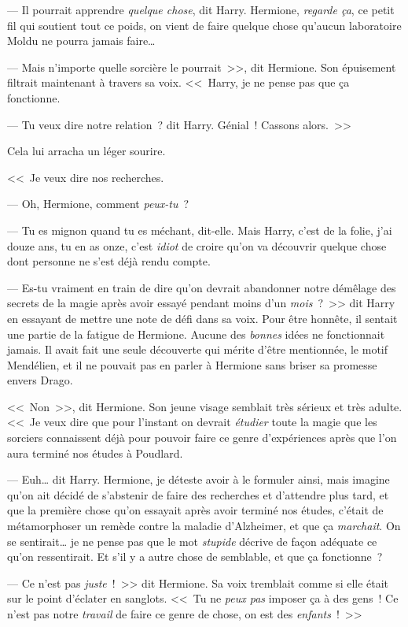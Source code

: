 --- Il pourrait apprendre \emph{quelque chose}, dit Harry. Hermione, \emph{regarde ça}, ce petit fil qui soutient tout ce poids, on vient de faire quelque chose qu'aucun laboratoire Moldu ne pourra jamais faire…

--- Mais n'importe quelle sorcière le pourrait~>>, dit Hermione. Son épuisement filtrait maintenant à travers sa voix. <<~Harry, je ne pense pas que ça fonctionne.

--- Tu veux dire notre relation~? dit Harry. Génial~! Cassons alors.~>>

Cela lui arracha un léger sourire.

<<~Je veux dire nos recherches.

--- Oh, Hermione, comment \emph{peux-tu}~?

--- Tu es mignon quand tu es méchant, dit-elle. Mais Harry, c'est de la folie, j'ai douze ans, tu en as onze, c'est \emph{idiot} de croire qu'on va découvrir quelque chose dont personne ne s'est déjà rendu compte.

--- Es-tu vraiment en train de dire qu'on devrait abandonner notre démêlage des secrets de la magie après avoir essayé pendant moins d'un \emph{mois}~?~>> dit Harry en essayant de mettre une note de défi dans sa voix. Pour être honnête, il sentait une partie de la fatigue de Hermione. Aucune des \emph{bonnes} idées ne fonctionnait jamais. Il avait fait une seule découverte qui mérite d'être mentionnée, le motif Mendélien, et il ne pouvait pas en parler à Hermione sans briser sa promesse envers Drago.

<<~Non~>>, dit Hermione. Son jeune visage semblait très sérieux et très adulte. <<~Je veux dire que pour l'instant on devrait \emph{étudier} toute la magie que les sorciers connaissent déjà pour pouvoir faire ce genre d'expériences après que l'on aura terminé nos études à Poudlard.

--- Euh… dit Harry. Hermione, je déteste avoir à le formuler ainsi, mais imagine qu'on ait décidé de s'abstenir de faire des recherches et d'attendre plus tard, et que la première chose qu'on essayait après avoir terminé nos études, c'était de métamorphoser un remède contre la maladie d'Alzheimer, et que ça \emph{marchait}. On se sentirait… je ne pense pas que le mot \emph{stupide} décrive de façon adéquate ce qu'on ressentirait. Et s'il y a autre chose de semblable, et que ça fonctionne~?

--- Ce n'est pas \emph{juste}~!~>> dit Hermione. Sa voix tremblait comme si elle était sur le point d'éclater en sanglots. <<~Tu ne \emph{peux pas} imposer ça à des gens~! Ce n'est pas notre \emph{travail} de faire ce genre de chose, on est des \emph{enfants}~!~>>


